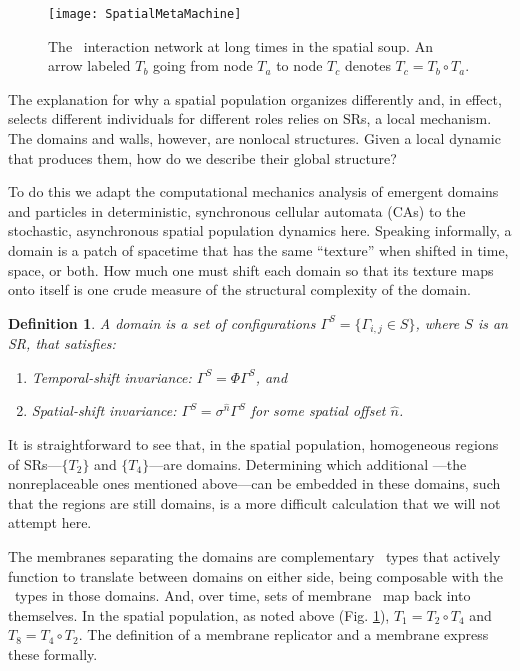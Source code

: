 \documentclass[pre,twocolumn,showpacs,superscriptaddress,preprintnumbers,floatfix]{revtex4}
\theoremstyle{plain}    \newtheorem{Lem}{Lemma}
\theoremstyle{plain}    \newtheorem*{ProLem}{Proof}
\theoremstyle{plain}    \newtheorem{Cor}{Corollary}
\theoremstyle{plain}    \newtheorem*{ProCor}{Proof}
\theoremstyle{plain}    \newtheorem{The}{Theorem}
\theoremstyle{plain}    \newtheorem*{ProThe}{Proof}
\theoremstyle{plain}    \newtheorem{Prop}{Proposition}
\theoremstyle{plain}    \newtheorem*{ProProp}{Proof}
\theoremstyle{plain}    \newtheorem*{Conj}{Conjecture}
\theoremstyle{plain}    \newtheorem*{Rem}{Remark}
\theoremstyle{plain}    \newtheorem{Def}{Definition}
\theoremstyle{plain}    \newtheorem*{Not}{Notation}
\begin{document}
\begin{figure}[hbtp]
  \texttt{[image: SpatialMetaMachine]}
\caption{The \eM\ interaction network at long times in the spatial soup. An
  arrow labeled $T_b$ going from node $T_a$ to node $T_c$ denotes
  $T_c = T_b \circ T_a$.
  }
\label{fig:SpatialMetaMachine}
\end{figure}

The explanation for why a spatial population organizes differently
and, in effect, selects different individuals for different roles
relies on SRs, a local mechanism. The domains and walls, however,
are nonlocal structures. Given a local dynamic that produces them,
how do we describe their global structure?

To do this we adapt the computational mechanics analysis of emergent domains and
particles in deterministic, synchronous cellular automata (CAs)
\cite{CACMechMerge} to the stochastic, asynchronous spatial
population dynamics here. Speaking informally, a domain is a patch of spacetime
that has the same ``texture'' when shifted in time, space, or both. How much
one must shift each domain so that its texture maps onto itself is one crude
measure of the structural complexity of the domain.

\begin{Def}
A \emph{domain} is a set of configurations
$\Gamma^{S} = \{ \Gamma_{i,j} \in S \}$, where $S$ is an SR, that satisfies:
\begin{enumerate}
\item Temporal-shift invariance: $\Gamma^{S} = \Phi \Gamma^{S}$, and
\item Spatial-shift invariance: $\Gamma^{S} = \sigma^{\widehat{n}} \Gamma^{S}$
for some spatial offset $\widehat{n}$.
\end{enumerate}
\label{def:Domain}
\end{Def}

It is straightforward to see that, in the spatial population, homogeneous
regions of SRs---$\{T_2\}$ and $\{T_4\}$---are domains. Determining which
additional \eMs---the nonreplaceable ones mentioned above---can be embedded in
these domains, such that the regions are still domains, is a more difficult
calculation that we will not attempt here.

The membranes separating the domains are complementary \eM\ types that actively
function to translate between domains on either side, being composable with
the \eM\ types in those domains. And, over time, sets of membrane \eMs\ map
back into themselves. In the spatial population, as noted above
(Fig. \ref{fig:SpatialMetaMachine}),
$T_1 = T_2 \circ T_4$ and $T_8 = T_4 \circ T_2$. The definition of a membrane
replicator and a membrane express these formally.
\end{document}
